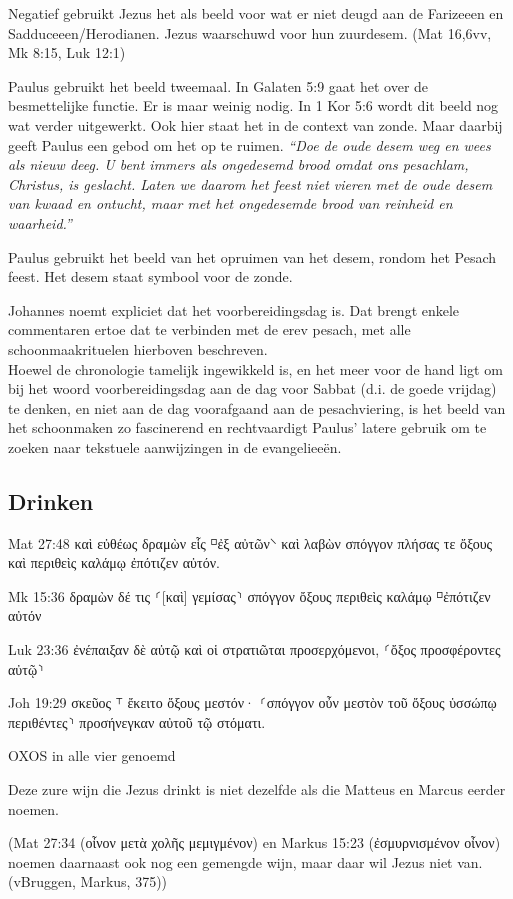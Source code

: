 \documentclass[a4paper,11pt]{article}
\newcommand{\q}[1]{\textit{\enquote{#1}}}
\begin{document}
Negatief gebruikt Jezus het als beeld voor wat er niet deugd aan de Farizeeen en Sadduceeen/Herodianen. Jezus waarschuwd voor hun zuurdesem. (Mat 16,6vv, Mk 8:15, Luk 12:1)

Paulus gebruikt het beeld tweemaal. In Galaten 5:9 gaat het over de besmettelijke functie. Er is maar weinig nodig. In 1 Kor 5:6 wordt dit beeld nog wat verder uitgewerkt. Ook hier staat het in de context van zonde. Maar daarbij geeft Paulus een gebod om het op te ruimen. 
\q{Doe de oude desem weg en wees als nieuw deeg. U bent immers als ongedesemd brood omdat ons pesachlam, Christus, is geslacht. Laten we daarom het feest niet vieren met de oude desem van kwaad en ontucht, maar met het ongedesemde brood van reinheid en waarheid.}

Paulus gebruikt het beeld van het opruimen van het desem, rondom het Pesach feest. Het desem staat symbool voor de zonde.

Johannes noemt expliciet dat het voorbereidingsdag is. Dat brengt enkele commentaren ertoe dat te verbinden met de erev pesach, met alle schoonmaakrituelen hierboven beschreven.\\
Hoewel de chronologie tamelijk ingewikkeld is, en het meer voor de hand ligt om bij het woord voorbereidingsdag aan de dag voor Sabbat (d.i. de goede vrijdag) te denken, en niet aan de dag voorafgaand aan de pesachviering, is het beeld van het schoonmaken zo fascinerend en rechtvaardigt Paulus' latere gebruik om te zoeken naar tekstuele aanwijzingen in de evangelieeën.

\subsection*{Drinken}


Mat 27:48
καὶ εὐθέως δραμὼν εἷς  ⸋ἐξ αὐτῶν⸌ καὶ λαβὼν σπόγγον πλήσας τε ὄξους καὶ περιθεὶς καλάμῳ ἐπότιζεν αὐτόν.

Mk 15:36
δραμὼν δέ τις  ⸂[καὶ] γεμίσας⸃ σπόγγον ὄξους περιθεὶς καλάμῳ  ⸋ἐπότιζεν αὐτόν

Luk 23:36
ἐνέπαιξαν δὲ αὐτῷ καὶ οἱ στρατιῶται προσερχόμενοι,  ⸂ὄξος προσφέροντες αὐτῷ⸃

Joh 19:29
σκεῦος  ⸆ ἔκειτο ὄξους μεστόν·  ⸂σπόγγον οὖν μεστὸν τοῦ ὄξους ὑσσώπῳ περιθέντες⸃ προσήνεγκαν αὐτοῦ τῷ στόματι.


OXOS in alle vier genoemd

Deze zure wijn die Jezus drinkt is niet dezelfde als die Matteus en Marcus eerder noemen.

(Mat 27:34 (οἶνον μετὰ χολῆς μεμιγμένον) en Markus 15:23 (ἐσμυρνισμένον οἶνον) noemen daarnaast ook nog een gemengde wijn, maar daar wil Jezus niet van. (vBruggen, Markus, 375))
\end{document}
